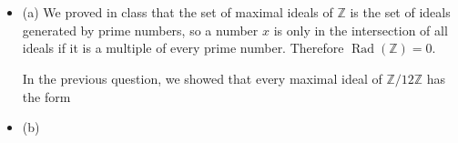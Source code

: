 \documentclass[12pt]{article}
\begin{document}
\section{}
\noindent{}\bigskip\par

\section{}
\noindent{}\bigskip\par
\begin{itemize}
    \item (a) We proved in class that the set of maximal ideals of $ \mathbb{Z}$ is the set of ideals generated by prime numbers, so a number $x$ is only in the intersection of all ideals if it is a multiple of every prime number. Therefore $\operatorname{Rad}( \mathbb{Z})=0$.
        \par
        In the previous question, we showed that every maximal ideal of $ \mathbb{Z}/12\mathbb{Z}$ has the form
    \item (b)
\end{itemize}
\end{document}
